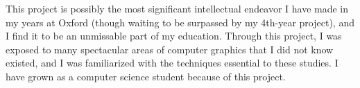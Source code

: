 This project is possibly the most significant intellectual endeavor I have made in my years at Oxford (though waiting to be surpassed by my 4th-year project), and I find it to be an unmissable part of my education. Through this project, I was exposed to many spectacular areas of computer graphics that I did not know existed, and I was familiarized with the techniques essential to these studies. I have grown as a computer science student because of this project.